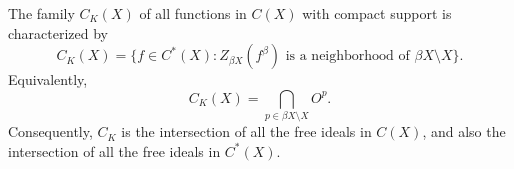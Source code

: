 The family $C_K(X)$ of all functions in $C(X)$ with compact support is characterized by
$$C_K(X) = \{f \in C^*(X) : Z_{\beta X}(f^\beta) \text{ is a neighborhood of } \beta X \setminus X\}.$$
Equivalently,
$$C_K(X) = \bigcap_{p \in \beta X \setminus X} O^p.$$
Consequently, $C_K$ is the intersection of all the free ideals in $C(X)$, and also the intersection of all the free ideals in $C^*(X)$.
